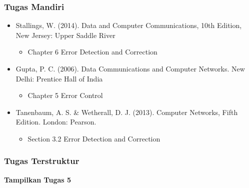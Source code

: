 \documentclass[pdflatex,compress]{beamer}
\begin{document}
\begin{frame}
	\frametitle{Tugas Mandiri}
	\begin{itemize}
		\item Stallings, W. (2014). Data and Computer Communications, 10th Edition, New Jersey: Upper Saddle River
		\begin{itemize}
			\item Chapter 6 Error Detection and Correction
		\end{itemize}
		\item Gupta, P. C. (2006). Data Communications and Computer Networks. New Delhi: Prentice Hall of India
		\begin{itemize}
			\item Chapter 5 Error Control
		\end{itemize}
		\item Tanenbaum, A. S. \& Wetherall, D. J. (2013). Computer Networks, Fifth Edition. London: Pearson.
		\begin{itemize}
			\item Section 3.2 Error Detection and Correction
		\end{itemize}
	\end{itemize}
\end{frame}

\begin{frame}
	\frametitle{Tugas Terstruktur}
	\textbf{Tampilkan Tugas 5}
\end{frame}
\end{document}
